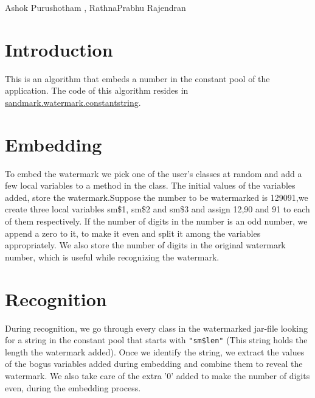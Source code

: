 %
          {Ashok Purushotham , RathnaPrabhu Rajendran}

\section{Introduction}
This is an algorithm that embeds a  number in the constant pool of the application. The code of this algorithm resides in \url{sandmark.watermark.constantstring}.


\section{Embedding}
To embed the watermark we pick one of the user's classes at random and add a few local variables to a method in the class. The initial values of the variables added, store the watermark.Suppose the number to be watermarked is 129091,we create three local variables sm\$1, sm\$2 and sm\$3 and assign 12,90 and 91 to each of them respectively. If the number of digits in the number is an odd number, we append a zero to it, to make it even and split it among the variables appropriately. We also store the number of digits  in the original watermark number, which is useful while recognizing the watermark.


\section{Recognition}
During recognition, we go through every class in the watermarked jar-file looking for a string in the constant pool that starts with {\tt "sm\$len"} (This string holds the length the watermark added). Once we identify the string, we extract the values of the bogus variables added during embedding and combine them to reveal the watermark. We also take care of the extra '0' added to make the number of digits even, during the embedding process.

